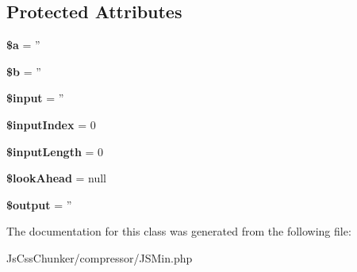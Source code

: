 \subsection*{Protected Attributes}
\begin{DoxyCompactItemize}
\item 
\hypertarget{class_j_s_min_acebf83966ef6d7e5645a6b62ba368f9f}{
{\bfseries \$a} = ''}
\label{class_j_s_min_acebf83966ef6d7e5645a6b62ba368f9f}

\item 
\hypertarget{class_j_s_min_ab9eb087b791749ae45deabb0899b7ccc}{
{\bfseries \$b} = ''}
\label{class_j_s_min_ab9eb087b791749ae45deabb0899b7ccc}

\item 
\hypertarget{class_j_s_min_a69b271260be394b90709736cccb22c76}{
{\bfseries \$input} = ''}
\label{class_j_s_min_a69b271260be394b90709736cccb22c76}

\item 
\hypertarget{class_j_s_min_a270923c71fbe82d5c22fb6bc00df653b}{
{\bfseries \$inputIndex} = 0}
\label{class_j_s_min_a270923c71fbe82d5c22fb6bc00df653b}

\item 
\hypertarget{class_j_s_min_a3f7d2762c67482330858a9cd32fa5cc0}{
{\bfseries \$inputLength} = 0}
\label{class_j_s_min_a3f7d2762c67482330858a9cd32fa5cc0}

\item 
\hypertarget{class_j_s_min_a58a4c0ac1cdec8877b44e8e692f0ab77}{
{\bfseries \$lookAhead} = null}
\label{class_j_s_min_a58a4c0ac1cdec8877b44e8e692f0ab77}

\item 
\hypertarget{class_j_s_min_a73004ce9cd673c1bfafd1dc351134797}{
{\bfseries \$output} = ''}
\label{class_j_s_min_a73004ce9cd673c1bfafd1dc351134797}

\end{DoxyCompactItemize}


The documentation for this class was generated from the following file:\begin{DoxyCompactItemize}
\item 
JsCssChunker/compressor/JSMin.php\end{DoxyCompactItemize}
